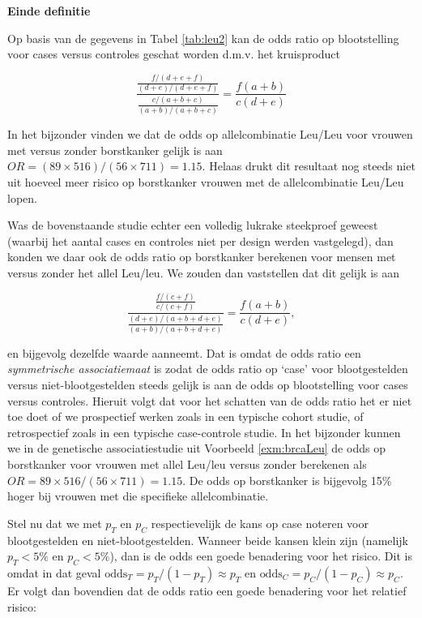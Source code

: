 \documentclass[
  12pt,dutch,coursenotes]{book}
\theoremstyle{definition}
\theoremstyle{definition}
\theoremstyle{definition}
\theoremstyle{remark}
\begin{document}
\textbf{Einde definitie}

Op basis van de gegevens in Tabel \ref{tab:leu2} kan de odds ratio op
blootstelling voor cases versus controles geschat worden d.m.v. het kruisproduct

\begin{equation*}
\frac{ \frac{ f/(d+e+f)}{(d+e)/(d+e+f)} }{ \frac{c/(a+b+c)}{(a+b)/(a+b+c)}} = \frac{f(a+b)}{c (d+e)}
\end{equation*}

In het bijzonder vinden we dat de odds op allelcombinatie Leu/Leu voor vrouwen met versus zonder borstkanker gelijk is aan \(OR=(89\times 516)/(56\times 711)=1.15\). Helaas drukt dit resultaat nog steeds
niet uit hoeveel meer risico op borstkanker vrouwen met de allelcombinatie Leu/Leu lopen.

Was de bovenstaande studie echter een volledig lukrake steekproef geweest
(waarbij het aantal cases en controles niet per design werden vastgelegd),
dan konden we daar ook de odds ratio op borstkanker berekenen voor mensen
met versus zonder het allel Leu/leu. We zouden dan vaststellen dat dit gelijk is
aan

\begin{equation*}
\frac{ \frac{ f/(c+f)}{c/(c+f)} }{ \frac{(d+e)/(a+b+d+e)}{(a+b)/(a+b+d+e)}} = \frac{f(a+b)}{c(d+e)},
\end{equation*}

en bijgevolg dezelfde waarde aanneemt. Dat is omdat de odds ratio een
\emph{symmetrische associatiemaat} is zodat de odds ratio op `case' voor
blootgestelden versus niet-blootgestelden steeds gelijk is aan de odds op
blootstelling voor cases versus controles. Hieruit volgt dat voor het
schatten van de odds ratio het er niet toe doet of we prospectief werken
zoals in een typische cohort studie, of retrospectief zoals in een typische
case-controle studie. In het bijzonder kunnen we in de genetische associatiestudie uit
Voorbeeld \ref{exm:brcaLeu} de odds op borstkanker voor vrouwen met allel Leu/leu
versus zonder berekenen als \(OR=89\times 516/(56\times 711)=1.15\).
De odds op borstkanker is bijgevolg 15\% hoger bij vrouwen met die specifieke allelcombinatie.

Stel nu dat we met \(p_T\) en \(p_C\) respectievelijk de kans op case noteren
voor blootgestelden en niet-blootgestelden. Wanneer beide kansen klein zijn
(namelijk \(p_T<5\%\) en \(p_C<5\%\)), dan is de odds een goede benadering voor
het risico. Dit is omdat in dat geval \(\mbox{odds}_T=p_T/(1-p_T)\approx p_T\) en \(\mbox{odds}_C=p_C/(1-p_C)\approx p_C\). Er volgt dan bovendien dat de odds ratio
een goede benadering voor het relatief risico:
\end{document}
